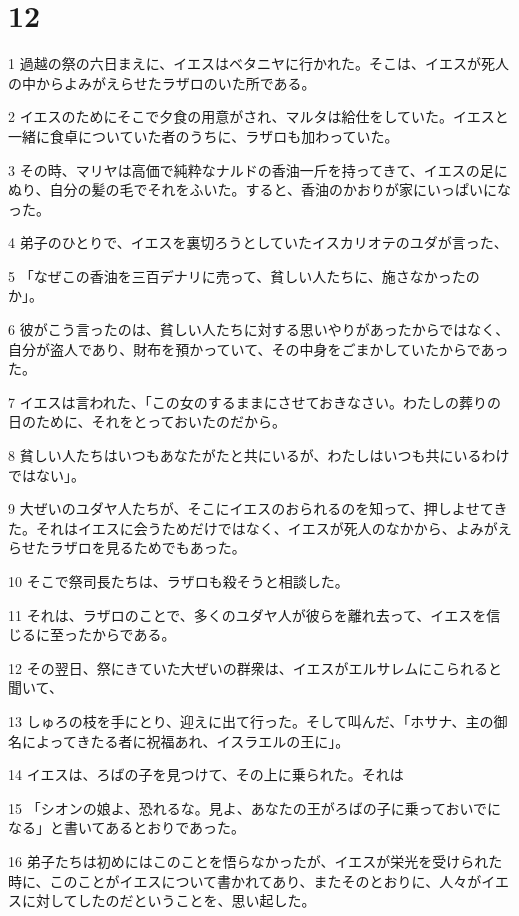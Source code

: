 \chapter{12}

\par 1 過越の祭の六日まえに、イエスはベタニヤに行かれた。そこは、イエスが死人の中からよみがえらせたラザロのいた所である。
\par 2 イエスのためにそこで夕食の用意がされ、マルタは給仕をしていた。イエスと一緒に食卓についていた者のうちに、ラザロも加わっていた。
\par 3 その時、マリヤは高価で純粋なナルドの香油一斤を持ってきて、イエスの足にぬり、自分の髪の毛でそれをふいた。すると、香油のかおりが家にいっぱいになった。
\par 4 弟子のひとりで、イエスを裏切ろうとしていたイスカリオテのユダが言った、
\par 5 「なぜこの香油を三百デナリに売って、貧しい人たちに、施さなかったのか」。
\par 6 彼がこう言ったのは、貧しい人たちに対する思いやりがあったからではなく、自分が盗人であり、財布を預かっていて、その中身をごまかしていたからであった。
\par 7 イエスは言われた、「この女のするままにさせておきなさい。わたしの葬りの日のために、それをとっておいたのだから。
\par 8 貧しい人たちはいつもあなたがたと共にいるが、わたしはいつも共にいるわけではない」。
\par 9 大ぜいのユダヤ人たちが、そこにイエスのおられるのを知って、押しよせてきた。それはイエスに会うためだけではなく、イエスが死人のなかから、よみがえらせたラザロを見るためでもあった。
\par 10 そこで祭司長たちは、ラザロも殺そうと相談した。
\par 11 それは、ラザロのことで、多くのユダヤ人が彼らを離れ去って、イエスを信じるに至ったからである。
\par 12 その翌日、祭にきていた大ぜいの群衆は、イエスがエルサレムにこられると聞いて、
\par 13 しゅろの枝を手にとり、迎えに出て行った。そして叫んだ、「ホサナ、主の御名によってきたる者に祝福あれ、イスラエルの王に」。
\par 14 イエスは、ろばの子を見つけて、その上に乗られた。それは
\par 15 「シオンの娘よ、恐れるな。見よ、あなたの王がろばの子に乗っておいでになる」と書いてあるとおりであった。
\par 16 弟子たちは初めにはこのことを悟らなかったが、イエスが栄光を受けられた時に、このことがイエスについて書かれてあり、またそのとおりに、人々がイエスに対してしたのだということを、思い起した。
